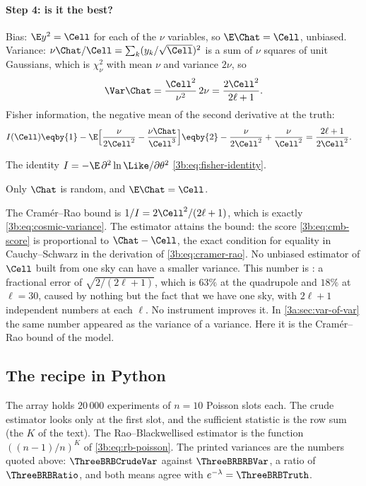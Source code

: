\paragraph{Step 4: is it the best?} Bias: $\E y^2=\Cell$ for each of the $\nu$
variables, so $\E\Chat=\Cell$, unbiased. Variance: $\nu\Chat/\Cell=\sum_k(y_k/\sqrt{\Cell})^2$
is a sum of $\nu$ squares of unit Gaussians, which is $\chi^2_\nu$ with mean $\nu$
and variance $2\nu$, so
\begin{equation}
  \Var\Chat=\frac{\Cell^2}{\nu^2}\,2\nu=\frac{2\Cell^2}{2\ell+1}.
  \label{3b:eq:cosmic-variance}
\end{equation}
Fisher information, the negative mean of the second derivative at the truth:
\begin{align}
  I(\Cell)&\eqby{1}-\E\Bigl[\frac{\nu}{2\Cell^2}-\frac{\nu\Chat}{\Cell^3}\Bigr]
   \eqby{2}-\frac{\nu}{2\Cell^2}+\frac{\nu}{\Cell^2}
   =\frac{2\ell+1}{2\Cell^2} .
  \label{3b:eq:cmb-fisher}
\end{align}
\begin{explain}
  \item The identity $I=-\E\,\partial^2\ln\Like/\partial\theta^2$ \eqref{3b:eq:fisher-identity}.
  \item Only $\Chat$ is random, and $\E\Chat=\Cell$.
\end{explain}
The Cram\'er--Rao bound is $1/I=2\Cell^2/(2\ell+1)$, which is exactly
\eqref{3b:eq:cosmic-variance}. The estimator attains the bound: the score
\eqref{3b:eq:cmb-score} is proportional to $\Chat-\Cell$, the exact condition
for equality in Cauchy--Schwarz in the derivation of
\eqref{3b:eq:cramer-rao}. No unbiased estimator of $\Cell$ built from one
sky can have a smaller variance. This number is : a fractional error of $\sqrt{2/(2\ell+1)}$, which is $63\%$ at the
quadrupole and $18\%$ at $\ell=30$, caused by nothing but the fact that we
have one sky, with $2\ell+1$ independent numbers at each $\ell$. No
instrument improves it. In \cref{3a:sec:var-of-var} the same number
appeared as the variance of a variance. Here it is the Cram\'er--Rao bound
of the model.

\subsection{The recipe in Python}
\label{3b:sec:recipe-python}

The array  holds $20\,000$ experiments of $n=10$ Poisson slots
each. The crude estimator looks only at the first slot, and the sufficient
statistic  is the row sum (the $K$ of the text). The
Rao--Blackwellised estimator is the function $((n-1)/n)^{K}$ of
\eqref{3b:eq:rb-poisson}. The printed variances are the numbers
quoted above: $\ThreeBRBCrudeVar$ against $\ThreeBRBRBVar$, a ratio of
$\ThreeBRBRatio$, and both means agree with $e^{-\lambda}=\ThreeBRBTruth$.

